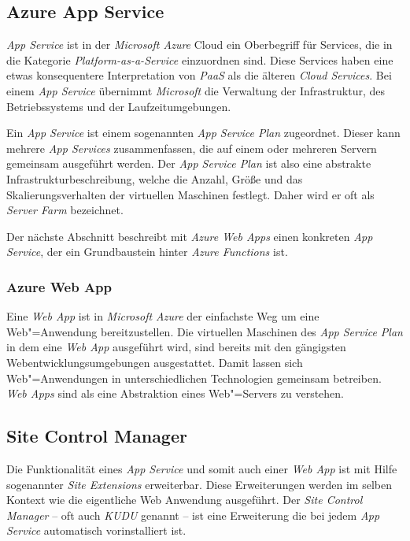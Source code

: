 \subsection{Azure App Service}

\textit{App Service} ist in der \textit{Microsoft Azure} Cloud ein Oberbegriff für Services, die in die Kategorie \textit{Platform-as-a-Service} einzuordnen sind. Diese Services haben eine etwas konsequentere Interpretation von \textit{PaaS} als die älteren \textit{Cloud Services}. Bei einem \textit{App Service} übernimmt \textit{Microsoft} die Verwaltung der Infrastruktur, des Betriebssystems und der Laufzeitumgebungen. 

Ein \textit{App Service} ist einem sogenannten \textit{App Service Plan} zugeordnet. Dieser kann mehrere \textit{App Services} zusammenfassen, die auf einem oder mehreren Servern gemeinsam ausgeführt werden. Der \textit{App Service Plan} ist also eine abstrakte Infrastrukturbeschreibung, welche die Anzahl, Größe und das Skalierungsverhalten der virtuellen Maschinen festlegt. Daher wird er oft als \textit{Server Farm} bezeichnet.

Der nächste Abschnitt beschreibt mit \textit{Azure Web Apps} einen konkreten \textit{App Service}, der ein Grundbaustein hinter \textit{Azure Functions} ist.

\subsubsection{Azure Web App}

Eine \textit{Web App} ist in \textit{Microsoft Azure} der einfachste Weg um eine Web"=Anwendung bereitzustellen. Die virtuellen Maschinen des \textit{App Service Plan} in dem eine \textit{Web App} ausgeführt wird, sind bereits mit den gängigsten Webentwicklungsumgebungen ausgestattet. Damit lassen sich Web"=Anwendungen in unterschiedlichen Technologien gemeinsam betreiben. \textit{Web Apps} sind als eine Abstraktion eines Web"=Servers zu verstehen.

\subsection{Site Control Manager}

Die Funktionalität eines \textit{App Service} und somit auch einer \textit{Web App} ist mit Hilfe sogenannter \textit{Site Extensions} erweiterbar. Diese Erweiterungen werden im selben Kontext wie die eigentliche Web Anwendung ausgeführt. Der \textit{Site Control Manager} -- oft auch \textit{KUDU} genannt -- ist eine Erweiterung die bei jedem \textit{App Service} automatisch vorinstalliert ist. 

